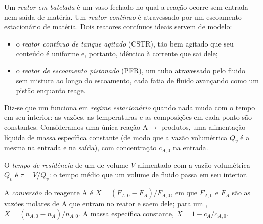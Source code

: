\begin{definition}\label{def:b2:continuous-reactors:reactors}
Um \emph{reator em batelada} é um vaso fechado no qual a
reação ocorre sem entrada nem saída de matéria. Um
\emph{reator contínuo} é atravessado por um
escoamento estacionário de matéria. Dois reatores contínuos ideais servem
de modelo:
\begin{itemize}
  \item o \emph{reator contínuo de tanque agitado}
(CSTR), tão bem agitado que seu conteúdo é
        uniforme e, portanto, idêntico à corrente que sai dele;
  \item o \emph{reator de escoamento pistonado} (PFR), um tubo
        atravessado pelo fluido sem mistura ao longo do escoamento, cada fatia
        de fluido avançando como um pistão enquanto reage.
\end{itemize}
\end{definition}

Diz-se que um  funciona em \emph{regime estacionário} quando
nada muda com o tempo em seu interior: as vazões, as temperaturas e as
composições em cada ponto são constantes. Consideramos uma única reação
$\mathrm A \to$ produtos, uma alimentação líquida de massa específica
constante (de modo que a vazão volumétrica $Q_v$ é a mesma na entrada e na
saída), com concentração $c_{A,0}$ na entrada.

\begin{definition}\label{def:b2:continuous-reactors:residence-time}
O \emph{tempo de residência} de um  de
volume $V$ alimentado com a vazão volumétrica $Q_v$ é $\tau = V/Q_v$: o tempo
médio que um volume de fluido passa em seu interior.
\end{definition}

\begin{definition}[Conversão]\label{def:b2:continuous-reactors:conversion}
A \emph{conversão} do reagente A é $X = (F_{A,0} -
F_A)/F_{A,0}$, em que $F_{A,0}$ e $F_A$ são as vazões molares de A que
entram no reator e saem dele; para um , $X = (n_{A,0} -
n_A)/n_{A,0}$. A massa específica constante, $X = 1 - c_A/c_{A,0}$.
\end{definition}

